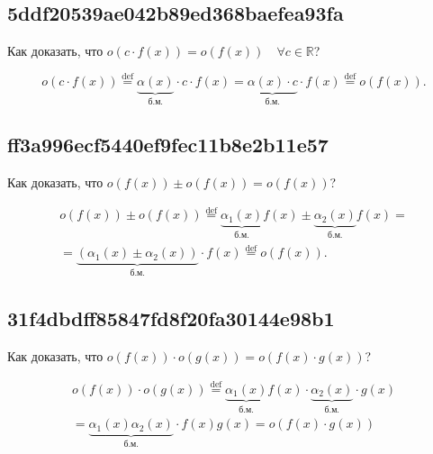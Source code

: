 \documentclass[11pt, a5paper]{article}
\newenvironment{note}[1]{\goodbreak\par\subsection{\hfill \color{lightgray}\tiny #1}}{}
\newenvironment{cloze}[2][\ldots]{\begin{leftbar}}{\end{leftbar}}
\begin{document}
    \begin{note}{5ddf20539ae042b89ed368baefea93fa}
        Как доказать, что \( o(c \cdot f(x)) = o(f(x)) \quad \forall c \in \mathbb R \)?

        \begin{cloze}{1}
            \[
                o(c \cdot f(x)) \overset{\text{def}}= \underbrace{\alpha(x)}_{\text{б.м.}} \operatorname{\cdot} c \operatorname{\cdot} f(x)
                = \underbrace{\alpha(x) \operatorname{\cdot} c}_{\text{б.м.} } \operatorname{\cdot} f(x) \overset{\text{def}}= o(f(x)).
            \]
        \end{cloze}
    \end{note}

    \begin{note}{ff3a996ecf5440ef9fec11b8e2b11e57}
        Как доказать, что \( o(f(x)) \pm o(f(x)) = o(f(x)) \)?

        \begin{cloze}{1}
            \begin{multline*}
                o(f(x)) \pm o(f(x)) \overset{\text{def}}= \underbrace{\alpha_1(x)}_{\text{б.м.} }  f(x) \pm \underbrace{\alpha_2(x)}_{\text{б.м.} }  f(x) = \\
                = \underbrace{(\alpha_1(x) \pm \alpha_2(x))}_{\text{б.м.} }  \operatorname{\cdot} f(x) \overset{\text{def}}= o(f(x)).
            \end{multline*}
        \end{cloze}
    \end{note}

    \begin{note}{31f4dbdff85847fd8f20fa30144e98b1}
        Как доказать, что \( o(f(x)) \operatorname{\cdot} o(g(x)) = o(f(x) \operatorname{\cdot} g(x)) \)?

        \begin{cloze}{1}
            \begin{multline*}
                o(f(x)) \operatorname{\cdot} o(g(x)) \overset{\text{def}}= \underbrace{\alpha_1(x)}_{\text{б.м.} }  f(x) \operatorname{\cdot} \underbrace{\alpha_2(x)}_{\text{б.м.} }  \operatorname{\cdot} g(x) \\
                = \underbrace{\alpha_1(x)\alpha_2(x)}_{\text{б.м.}} \operatorname{\cdot} f(x)g(x) = o(f(x) \operatorname{\cdot} g(x))
            \end{multline*}
        \end{cloze}
    \end{note}
\end{document}
